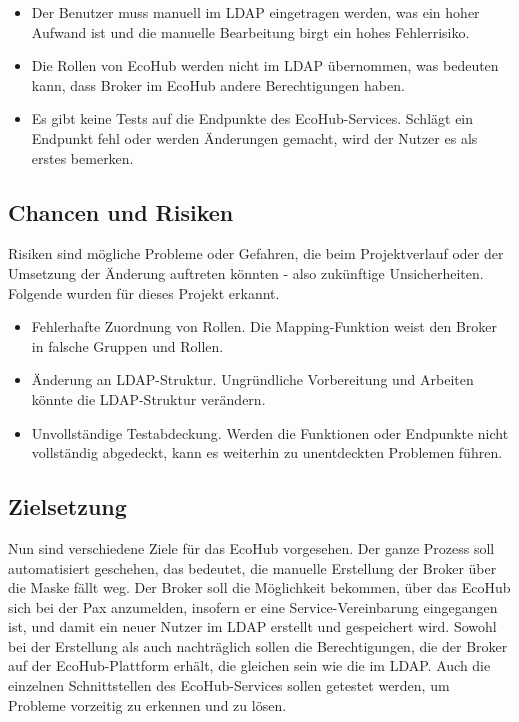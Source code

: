 \begin{itemize}
    \item Der Benutzer muss manuell im LDAP eingetragen werden, was ein hoher Aufwand ist und die manuelle Bearbeitung birgt ein hohes Fehlerrisiko.
    \item Die Rollen von EcoHub werden nicht im LDAP übernommen, was bedeuten kann, dass Broker im EcoHub andere Berechtigungen haben.
    \item Es gibt keine Tests auf die Endpunkte des EcoHub-Services. Schlägt ein Endpunkt fehl oder werden Änderungen gemacht, wird der Nutzer es als erstes bemerken.
\end{itemize}



\subsection{Chancen und Risiken}
\label{sec:chancen-risiken}
Risiken sind mögliche Probleme oder Gefahren, die beim Projektverlauf oder der Umsetzung der Änderung auftreten könnten - also zukünftige Unsicherheiten. Folgende wurden für dieses Projekt erkannt.

\begin{itemize}
    \item Fehlerhafte Zuordnung von Rollen. Die Mapping-Funktion weist den Broker in falsche Gruppen und Rollen.
    \item Änderung an LDAP-Struktur. Ungründliche Vorbereitung und Arbeiten könnte die LDAP-Struktur verändern.
    \item Unvollständige Testabdeckung. Werden die Funktionen oder Endpunkte nicht vollständig abgedeckt, kann es weiterhin zu unentdeckten Problemen führen.
\end{itemize}


\subsection{ Zielsetzung}
Nun sind verschiedene Ziele für das EcoHub vorgesehen. Der ganze Prozess soll automatisiert geschehen, das bedeutet, die manuelle Erstellung der Broker über die Maske fällt weg.
Der Broker soll die Möglichkeit bekommen, über das EcoHub sich bei der Pax anzumelden, insofern er eine Service-Vereinbarung eingegangen ist, und damit ein neuer Nutzer im LDAP erstellt und gespeichert wird.
Sowohl bei der Erstellung als auch nachträglich sollen die Berechtigungen, die der Broker auf der EcoHub-Plattform erhält, die gleichen sein wie die im LDAP.
Auch die einzelnen Schnittstellen des EcoHub-Services sollen getestet werden, um Probleme vorzeitig zu erkennen und zu lösen.

